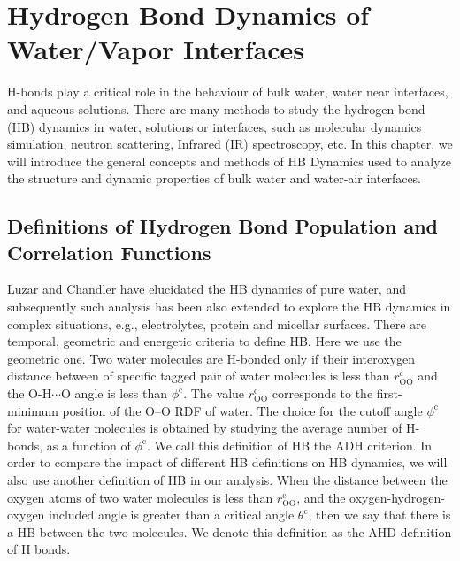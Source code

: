 \chapter{Hydrogen Bond Dynamics of Water/Vapor Interfaces }\label{CHAPTER_HB}
H-bonds play a critical role in the behaviour of bulk water,\cite{Eisenberg1969,Luzar1996,Cabane2005} water near interfaces,\cite{Chowdhary2008} 
and aqueous solutions. \cite{Naslund2005} There are many methods to study the hydrogen bond (HB) dynamics in water, solutions or interfaces, 
such as molecular dynamics simulation,\cite{Tongraar2006,Chanda2006,Tongraar2010,Chowdhary2008,Banerjee2016} neutron scattering, 
Infrared (IR) spectroscopy,\cite{Werhahn2011,Fournier2016} etc.
In this chapter, we will introduce the general concepts and methods of HB Dynamics \cite{AL96,Luzar1996,DC87} used to analyze the structure 
and dynamic properties of bulk water and water-air interfaces. 

\section{Definitions of Hydrogen Bond Population and Correlation Functions}
Luzar and Chandler \cite{AL96} have elucidated the HB dynamics of pure water, and
subsequently such analysis has been also extended to explore the HB dynamics
in complex situations, e.g., electrolytes, \cite{AC00} protein and  micellar surfaces. \cite{SP05}
There are temporal, geometric and energetic criteria to define HB. Here we use the geometric one.
Two water molecules are H-bonded only if their interoxygen distance between of specific tagged pair of water molecules 
is less than $r^{\text{c}}_{\text{OO}}$ and
the O-H$\cdots$O angle is less than $\phi^{\text{c}}$. \cite{AKS86,JT90,SB02} 
The value $r^{\text{c}}_{\text{OO}}$ corresponds to the first-minimum position of the O--O RDF of water. \cite{Sciortino1989}   
The choice for the cutoff angle $\phi^{\text{c}}$ for water-water molecules is obtained by studying the average number of H-bonds,
as a function of $\phi^{\text{c}}$. \cite{Luzar1993} We call this definition of HB the ADH criterion. 
In order to compare the impact of different HB definitions on HB dynamics, we will also use another definition of HB in our analysis. 
When the distance between the oxygen atoms of two water molecules is less than $r^{\text{c}}_{\text{OO}}$, 
and the oxygen-hydrogen-oxygen included angle is greater than a critical angle $\theta^{\text{c}}$, then we say that there is a HB between the two molecules. 
We denote this definition as the AHD definition of H bonds.

